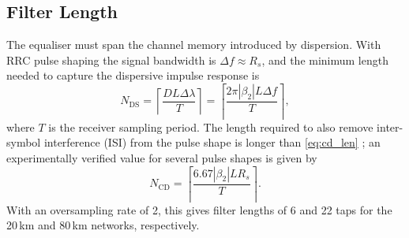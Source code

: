 \documentclass[12pt,a4paper]{article}
\begin{document}
\subsection{Filter Length}
The equaliser must span the channel memory introduced by dispersion. With RRC pulse shaping the signal bandwidth is $\Delta f \approx R_s$, and the minimum length needed to capture the dispersive impulse response is
\begin{equation}
    N_\mathrm{DS} = \left\lceil\frac{DL\Delta\lambda}{T}\right\rceil = \left\lceil\frac{2\pi|\beta_2|L\Delta f}{T}\right\rceil,
    \label{eq:cd_len}
\end{equation}
where \(T\) is the receiver sampling period. The length required to also remove inter-symbol interference (ISI) from the pulse shape is longer than \cref{eq:cd_len} \cite{Rozental;15}; an experimentally verified value for several pulse shapes is given by \cite{Ezra;07}
\begin{equation}
    N_\mathrm{CD} = \left\lceil\frac{6.67|\beta_2|LR_s}{T}\right\rceil.
\end{equation}
With an oversampling rate of 2, this gives filter lengths of 6 and 22 taps for the 20\,km and 80\,km networks, respectively.
\end{document}
